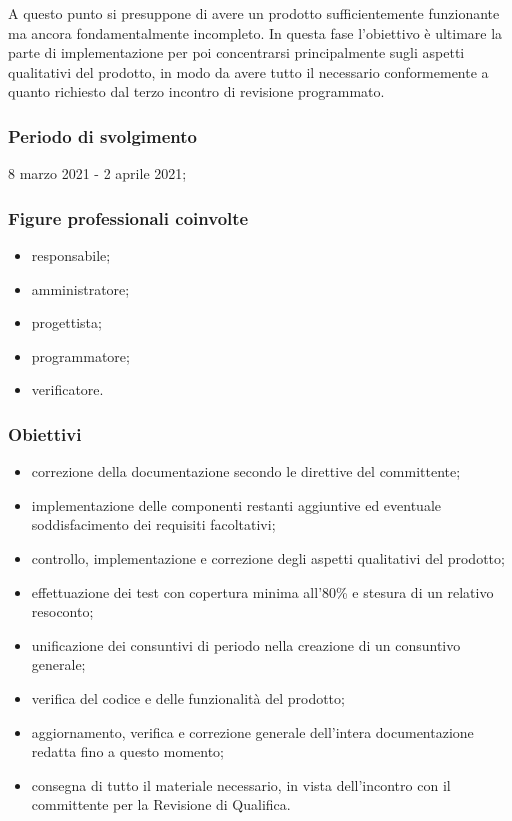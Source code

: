 A questo punto si presuppone di avere un prodotto sufficientemente funzionante ma ancora fondamentalmente incompleto. In questa fase l'obiettivo è ultimare la parte di implementazione per poi concentrarsi principalmente sugli aspetti qualitativi del prodotto, in modo da avere tutto il necessario conformemente a quanto richiesto dal terzo incontro di revisione programmato.
        
        \subsubsection{Periodo di svolgimento}
        8 marzo 2021 - 2 aprile 2021;
        
        \subsubsection{Figure professionali coinvolte}
            \begin{itemize}
                \item responsabile;
                \item amministratore;
                \item progettista;
                \item programmatore;
                \item verificatore.
            \end{itemize}

        \subsubsection{Obiettivi}
        \begin{itemize}
            \item correzione della documentazione secondo le direttive del committente;
            \item implementazione delle componenti restanti aggiuntive ed eventuale soddisfacimento dei requisiti facoltativi;
            \item controllo, implementazione e correzione degli aspetti qualitativi del prodotto;
            \item effettuazione dei test con copertura minima all'80\% e stesura di un relativo resoconto;
            \item unificazione dei consuntivi di periodo nella creazione di un consuntivo generale;
            \item verifica del codice e delle funzionalità del prodotto;
            \item aggiornamento, verifica e correzione generale dell'intera documentazione redatta fino a questo momento;
            \item consegna di tutto il materiale necessario, in vista dell'incontro con il committente per la Revisione di Qualifica.
        \end{itemize}
